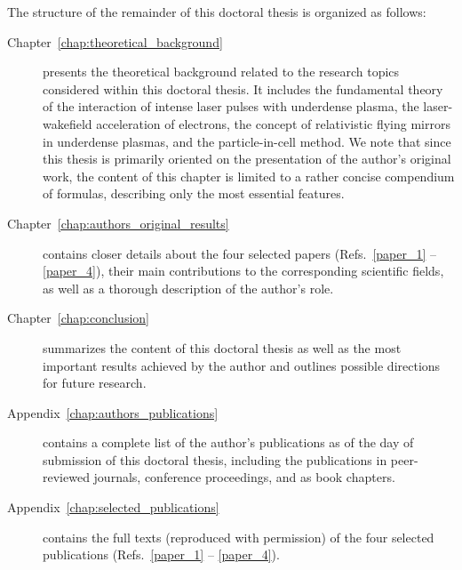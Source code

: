 \documentclass[10pt, a4paper, twoside, openright]{report}
\begin{document}
The structure of the remainder of this doctoral thesis is organized as follows:

\begin{description}
	\item[Chapter~\ref{chap:theoretical_background}] presents the theoretical background related to the research topics considered within this doctoral thesis. It includes the fundamental theory of the interaction of intense laser pulses with underdense plasma, the laser-wakefield acceleration of electrons, the concept of relativistic flying mirrors in underdense plasmas, and the particle-in-cell method. We note that since this thesis is primarily oriented on the presentation of the author's original work, the content of this chapter is limited to a rather concise compendium of formulas, describing only the most essential features. 
	
	\item[Chapter~\ref{chap:authors_original_results}] contains closer details about the four selected papers (Refs.~\ref{paper_1} -- \ref{paper_4}), their main contributions to the corresponding scientific fields, as well as a thorough description of the author's role. 
	
	\item[Chapter~\ref{chap:conclusion}] summarizes the content of this doctoral thesis as well as the most important results achieved by the author and outlines possible directions for future research. 
	
	\item[Appendix~\ref{chap:authors_publications}] contains a complete list of the author's publications as of the day of submission of this doctoral thesis, including the publications in peer-reviewed journals, conference proceedings, and as book chapters.
	
	\item[Appendix~\ref{chap:selected_publications}] contains the full texts (reproduced with permission) of the four selected publications (Refs.~\ref{paper_1} -- \ref{paper_4}).
	
\end{description}
	

\end{document}
